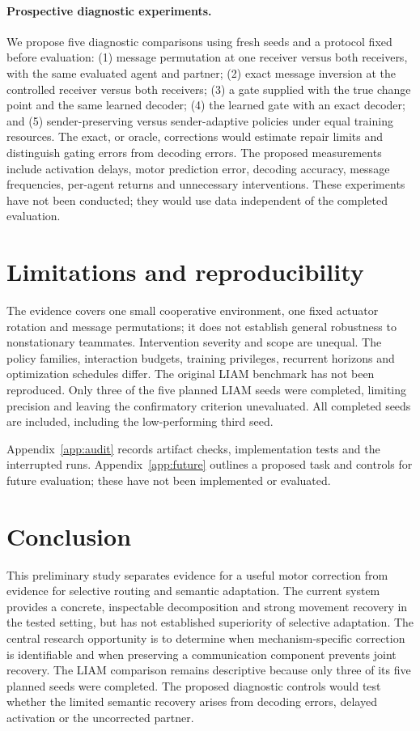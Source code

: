 \documentclass[10pt,a4paper]{article}
\begin{document}
\paragraph{Prospective diagnostic experiments.}
We propose five diagnostic comparisons using fresh seeds and a protocol fixed before evaluation: (1) message permutation at one receiver versus both receivers, with the same evaluated agent and partner; (2) exact message inversion at the controlled receiver versus both receivers; (3) a gate supplied with the true change point and the same learned decoder; (4) the learned gate with an exact decoder; and (5) sender-preserving versus sender-adaptive policies under equal training resources. The exact, or oracle, corrections would estimate repair limits and distinguish gating errors from decoding errors. The proposed measurements include activation delays, motor prediction error, decoding accuracy, message frequencies, per-agent returns and unnecessary interventions. These experiments have not been conducted; they would use data independent of the completed evaluation.

\section{Limitations and reproducibility}
The evidence covers one small cooperative environment, one fixed actuator rotation and message permutations; it does not establish general robustness to nonstationary teammates. Intervention severity and scope are unequal. The policy families, interaction budgets, training privileges, recurrent horizons and optimization schedules differ. The original LIAM benchmark has not been reproduced. Only three of the five planned LIAM seeds were completed, limiting precision and leaving the confirmatory criterion unevaluated. All completed seeds are included, including the low-performing third seed.

Appendix~\ref{app:audit} records artifact checks, implementation tests and the interrupted runs. Appendix~\ref{app:future} outlines a proposed task and controls for future evaluation; these have not been implemented or evaluated.

\section{Conclusion}
This preliminary study separates evidence for a useful motor correction from evidence for selective routing and semantic adaptation. The current system provides a concrete, inspectable decomposition and strong movement recovery in the tested setting, but has not established superiority of selective adaptation. The central research opportunity is to determine when mechanism-specific correction is identifiable and when preserving a communication component prevents joint recovery. The LIAM comparison remains descriptive because only three of its five planned seeds were completed. The proposed diagnostic controls would test whether the limited semantic recovery arises from decoding errors, delayed activation or the uncorrected partner.
\end{document}
